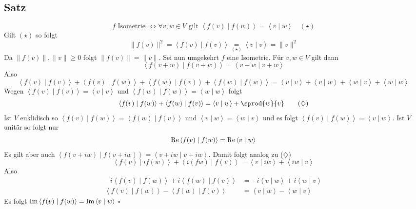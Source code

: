 \subsection[Satz über Isometrie und das Skalarprodukt]{Satz} %
\label{sub:12}
\[
	f \text{ Isometrie } \iff \forall v,w \in V \text{ gilt } \left\langle f(v) \mid f(w) \right\rangle  = \left\langle v \mid w \right\rangle \quad (\star)
\]
Gilt $(\star)$ so folgt
\[
	\| f(v) \|^2 = \left\langle f(v) \mid f(v) \right\rangle \underset{(\star)}{=} \left\langle v \mid v \right\rangle = \| v\|^2 
\]
Da $\| f(v) \| , \| v\| \ge 0$ folgt $\| f(v) \| = \|v\|$. Sei nun umgekehrt $f$ eine Isometrie. Für $v,w \in V$ gilt dann 
\[
	\left\langle f(v+w) \mid f(v+w) \right\rangle = \left\langle v+w \mid v+w \right\rangle 
\]
Also
\[
	\left\langle f(v) \mid f(v) \right\rangle + \left\langle f(v) \mid f(w) \right\rangle + \left\langle f(w) \mid f(v) \right\rangle + \left\langle f(w) \mid f(w) \right\rangle  = \left\langle v \mid v \right\rangle + \left\langle v \mid w \right\rangle + \left\langle w \mid v \right\rangle + \left\langle w \mid w \right\rangle 
\]
Wegen $\left\langle f(v) \mid f(v) \right\rangle = \left\langle v \mid v \right\rangle $ und $\left\langle f(w) \mid f(w) \right\rangle = \left\langle w \mid w \right\rangle $ folgt
\[
	\left\langle f(v) \mid f(w) \right\rangle + \left\langle f(w) \mid f(v) \right\rangle = \left\langle v \mid w \right\rangle + \sprod{w}{v} \tag{$\diamondsuit$}  
\]
Ist $V$ euklidisch so $\left\langle f(v) \mid f(w)	 \right\rangle = \left\langle f(w) \mid f(v) \right\rangle  $ und $\left\langle v \mid w \right\rangle = \left\langle w \mid v \right\rangle $ und es folgt $\left\langle f(v) \mid f(w) \right\rangle = \left\langle v \mid w \right\rangle $. Ist $V$ unitär so folgt nur 
\[
	\operatorname{Re} \left\langle f(v) \mid f(w) \right\rangle = \operatorname{Re} \left\langle v \mid w \right\rangle 
\]
Es gilt aber auch $\left\langle f(v+iw) \mid f(v+iw) \right\rangle = \left\langle v+ iw \mid v+iw \right\rangle $. Damit folgt analog zu ($\diamondsuit$)
\[
	\left\langle f(v) \mid i f(w) \right\rangle + \left\langle i(fw) \mid f(v) \right\rangle = \left\langle v \mid iw \right\rangle + \left\langle iw \mid v \right\rangle 
\]
Also
\begin{align*}
	-i \left\langle f(v) \mid f(w) \right\rangle + i \left\langle f(w) \mid f(v) \right\rangle &= -i \left\langle v \mid w \right\rangle + i \left\langle w \mid v \right\rangle \\
	\left\langle f(v) \mid f(w) \right\rangle - \left\langle f(w) \mid f(v) \right\rangle &= \left\langle v \mid w \right\rangle - \left\langle w \mid v \right\rangle
	\tag{Multiplikation mit $i$} 
\end{align*}
Es folgt $\operatorname{Im} \left\langle f(v) \mid f(w) \right\rangle = \operatorname{Im} \left\langle v \mid w \right\rangle $ \hfill \( \square \)

